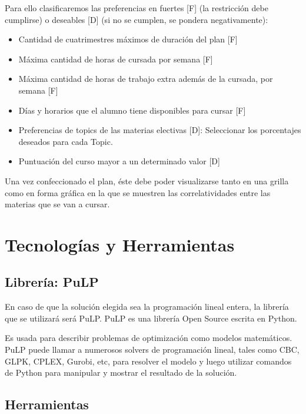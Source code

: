 \documentclass[a4paper]{article}
\begin{document}
Para ello clasificaremos las preferencias en fuertes [F] (la restricción debe cumplirse) o deseables [D] (si no se cumplen, se pondera negativamente):

\begin{itemize}
	\item Cantidad de cuatrimestres máximos de duración del plan [F]
	\item Máxima cantidad de horas de cursada por semana [F]
	\item Máxima cantidad de horas de trabajo extra además de la cursada, por semana [F]
	\item Días y horarios que el alumno tiene disponibles para cursar [F]
	\item Preferencias de topics de las materias electivas [D]: Seleccionar los porcentajes deseados para cada Topic.
	\item Puntuación del curso mayor a un determinado valor [D]	
\end{itemize}

Una vez confeccionado el plan, éste debe poder visualizarse tanto en una grilla como en forma gráfica en la que se muestren las correlatividades entre las materias que se van a cursar.

\section{Tecnologías y Herramientas}

\subsection{Librería: PuLP}

En caso de que la solución elegida sea la programación lineal entera, la librería que se utilizará será PuLP. PuLP es una librería Open Source escrita en Python.

Es usada para describir problemas de optimización como modelos matemáticos. PuLP puede llamar a numerosos solvers de programación lineal, tales como CBC, GLPK, CPLEX, Gurobi, etc, para resolver el modelo y luego utilizar comandos de Python para manipular y mostrar el resultado de la solución.

\subsection{Herramientas}
\end{document}

